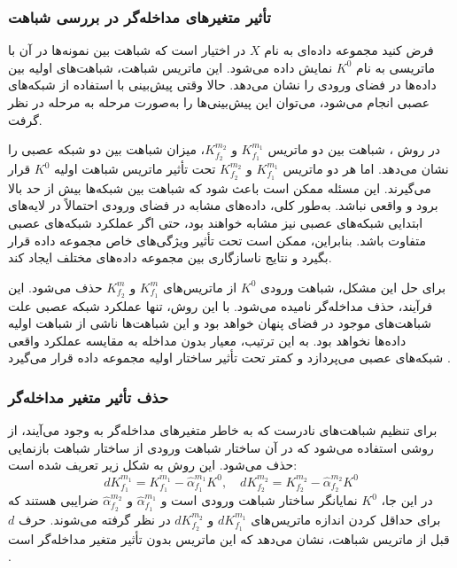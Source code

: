\vspace{3mm}
\subsubsection{
	تأثیر متغیرهای مداخله‌گر%
	در بررسی شباهت
}\vspace{-1mm}
فرض کنید مجموعه داده‌ای به نام \(X\) در اختیار است که شباهت بین نمونه‌ها در آن با ماتریسی به نام
\( K^0 \)
نمایش داده می‌شود. این ماتریس شباهت، شباهت‌های اولیه بین داده‌ها در فضای ورودی را نشان می‌دهد. حالا وقتی پیش‌بینی با استفاده از شبکه‌های عصبی انجام می‌شود، می‌توان این پیش‌بینی‌ها را به‌صورت مرحله به مرحله در نظر گرفت.

در روش
%
، شباهت بین دو ماتریس \(K_{f_1}^{m_1}\) و \(K_{f_2}^{m_2}\)، میزان شباهت بین دو شبکه عصبی را نشان می‌دهد. اما هر دو ماتریس \(K_{f_1}^{m_1}\) و \(K_{f_2}^{m_2}\) تحت تأثیر ماتریس شباهت اولیه
\( K^0 \)
قرار می‌گیرند. این مسئله ممکن است باعث شود که شباهت بین شبکه‌ها بیش از حد بالا برود و واقعی نباشد. به‌طور کلی، داده‌های مشابه در فضای ورودی احتمالاً در لایه‌های ابتدایی شبکه‌های عصبی نیز مشابه خواهند بود، حتی اگر عملکرد شبکه‌های عصبی متفاوت باشد. بنابراین،
ممکن است تحت تأثیر ویژگی‌های خاص مجموعه داده قرار بگیرد و نتایج ناسازگاری بین مجموعه داده‌های مختلف ایجاد کند.

برای حل این مشکل، شباهت ورودی \(K^0\) از ماتریس‌های \(K^{m}_{f_1}\) و \(K^{m}_{f_2}\) حذف می‌شود. این فرآیند، حذف مداخله‌گر نامیده می‌شود. با این روش، تنها عملکرد شبکه عصبی علت شباهت‌های موجود در فضای پنهان خواهد بود و این شباهت‌ها ناشی از شباهت اولیه داده‌ها نخواهد بود. به این ترتیب، معیار بدون مداخله به مقایسه عملکرد واقعی شبکه‌های عصبی می‌پردازد و کمتر تحت تأثیر ساختار اولیه مجموعه داده قرار می‌گیرد
\cite{cui2022deconfounded}.


\vspace{3mm}
\subsubsection{حذف تأثیر متغیر مداخله‌گر}\vspace{-1mm}
برای تنظیم شباهت‌های نادرست که به خاطر متغیرهای مداخله‌گر به وجود می‌آیند، از روشی استفاده می‌شود که در آن ساختار شباهت ورودی از ساختار شباهت بازنمایی حذف می‌شود. این روش به شکل زیر تعریف شده است:
\begin{equation}
 dK^{m_1}_{f_1} = K^{m_1}_{f_1} - \hat{\alpha}^{m_1}_{f_1} K^0,  \quad
dK^{m_2}_{f_2} = K^{m_2}_{f_2} - \hat{\alpha}^{m_2}_{f_2} K^0
\end{equation}
در این جا، \(K^0\) نمایانگر ساختار شباهت ورودی است و \(\hat{\alpha}^{m_1}_{f_1}\) و \(\hat{\alpha}^{m_2}_{f_2}\) ضرایبی هستند که برای حداقل کردن اندازه‌ ماتریس‌های \(dK^{m_1}_{f_1}\) و \(dK^{m_2}_{f_2}\) در نظر گرفته می‌شوند. حرف \(d\) قبل از ماتریس شباهت، نشان می‌دهد که این ماتریس بدون تأثیر متغیر مداخله‌گر است
\cite{cui2022deconfounded}.

